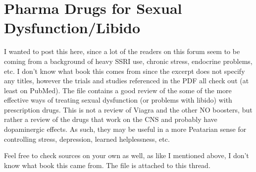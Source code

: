 \chapter{Pharma Drugs for Sexual Dysfunction/Libido}

\begin{refsection}

I wanted to post this here, since a lot of the readers on this forum seem to be coming from a background of heavy SSRI use, chronic stress, endocrine problems, etc. I don't know what book this comes from since the excerpt does not specify any titles, however the trials and studies referenced in the PDF all check out (at least on PubMed). The file contains a good review of the some of the more effective ways of treating sexual dysfunction (or problems with libido) with prescription drugs. This is not a review of Viagra and the other NO boosters, but rather a review of the drugs that work on the CNS and probably have dopaminergic effects. As such, they may be useful in a more Peatarian sense for controlling stress, depression, learned helplessness, etc.

Feel free to check sources on your own as well, as like I mentioned above, I don't know what book this came from. The file is attached to this thread.

\printbibliography[heading=subbibliography]

\end{refsection}